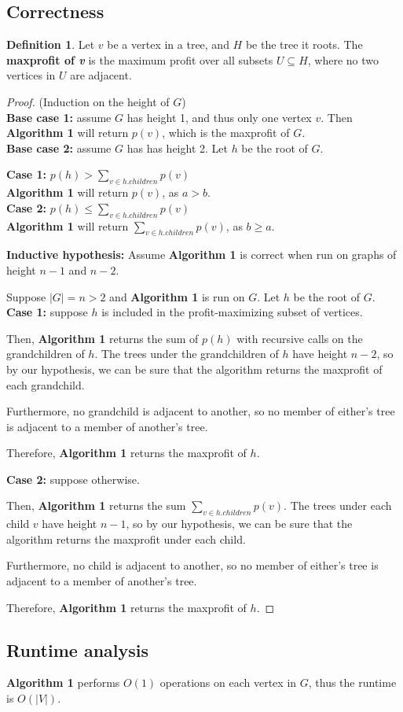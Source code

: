 \documentclass[11pt]{article}
\theoremstyle{plain}
\theoremstyle{definition}
\newtheorem*{defn}{Definition}
\begin{document}
\subsection{Correctness}

\begin{defn}
    Let $v$ be a vertex in a tree, and $H$ be the tree it roots. 
    The \textbf{maxprofit of \textit{v}} is the maximum profit over all subsets $U \subseteq H$, 
    where no two vertices in $U$ are adjacent.
\end{defn}

\begin{proof} (Induction on the height of $G$)\\
    \textbf{Base case 1:} assume $G$ has height 1, and thus only one vertex $v$. 
    Then \textbf{Algorithm 1} will return $p(v)$, which is the maxprofit of $G$.\\
    \noindent\textbf{Base case 2:} assume $G$ has has height 2. Let $h$ be the root of $G$.
    
    \indent\textbf{Case 1:} $p(h) > \sum_{v \in h.children} p(v)$\\
    \indent\indent\textbf{Algorithm 1} will return $p(v)$, as $a > b$.\\
    \indent\textbf{Case 2:} $p(h) \leq \sum_{v \in h.children} p(v)$\\
    \indent\indent\textbf{Algorithm 1} will return $\sum_{v \in h.children} p(v)$, as $b \geq a$.
    \bigbreak

    \noindent\textbf{Inductive hypothesis:} Assume \textbf{Algorithm 1} is correct when run on graphs
    of height $n - 1$ and $n - 2$.
    \bigbreak
    
    \noindent Suppose $|G| = n > 2$ and \textbf{Algorithm 1} is run on $G$. Let $h$ be the root of $G$.
    \bigbreak
    \indent\textbf{Case 1:} suppose $h$ is included in the profit-maximizing subset of
    vertices. 

    Then, \textbf{Algorithm 1} returns the sum of $p(h)$ with recursive calls on the grandchildren of $h$.
    The trees under the grandchildren of $h$ have height $n - 2$, so by our hypothesis, we can be 
    sure that the algorithm returns the maxprofit of each grandchild.  

    Furthermore, no grandchild is adjacent to another, so no member of either's tree is adjacent to 
    a member of another's tree.

    Therefore, \textbf{Algorithm 1} returns the maxprofit of $h$.
    \bigbreak

    \indent\textbf{Case 2:} suppose otherwise.

    Then, \textbf{Algorithm 1} returns the sum $\sum_{v \in h.children} p(v)$. The trees under each 
    child $v$ have height $n - 1$, so by our hypothesis, we can be sure that the algorithm returns 
    the maxprofit under each child. 

    Furthermore, no child is adjacent to another, so no member of either's tree is adjacent to 
    a member of another's tree.

    Therefore, \textbf{Algorithm 1} returns the maxprofit of $h$.
\end{proof}

\subsection{Runtime analysis}

\textbf{Algorithm 1} performs $O(1)$ operations on each vertex in $G$, thus the runtime
is $O(|V|)$.
\end{document}
